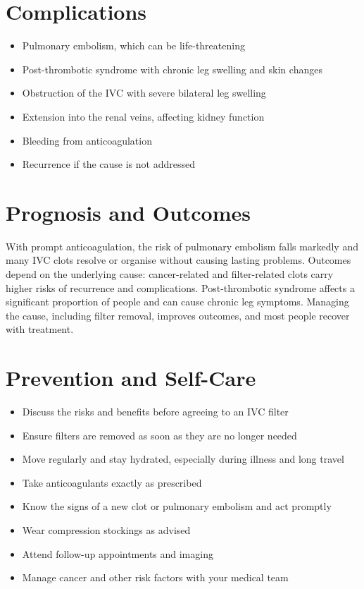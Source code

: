 \section*{Complications}
\begin{itemize}
    \item Pulmonary embolism, which can be life-threatening
    \item Post-thrombotic syndrome with chronic leg swelling and skin changes
    \item Obstruction of the IVC with severe bilateral leg swelling
    \item Extension into the renal veins, affecting kidney function
    \item Bleeding from anticoagulation
    \item Recurrence if the cause is not addressed
\end{itemize}

\section*{Prognosis and Outcomes}
With prompt anticoagulation, the risk of pulmonary embolism falls markedly and many IVC clots resolve or organise without causing lasting problems. Outcomes depend on the underlying cause: cancer-related and filter-related clots carry higher risks of recurrence and complications. Post-thrombotic syndrome affects a significant proportion of people and can cause chronic leg symptoms. Managing the cause, including filter removal, improves outcomes, and most people recover with treatment.

\section*{Prevention and Self-Care}
\begin{itemize}
    \item Discuss the risks and benefits before agreeing to an IVC filter
    \item Ensure filters are removed as soon as they are no longer needed
    \item Move regularly and stay hydrated, especially during illness and long travel
    \item Take anticoagulants exactly as prescribed
    \item Know the signs of a new clot or pulmonary embolism and act promptly
    \item Wear compression stockings as advised
    \item Attend follow-up appointments and imaging
    \item Manage cancer and other risk factors with your medical team
\end{itemize}

